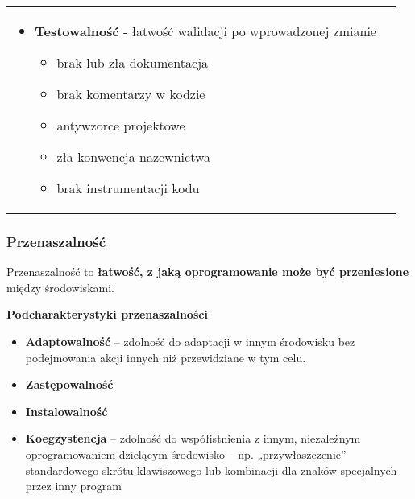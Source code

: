 \documentclass[../main.tex]{subfiles}
\begin{document}
\begin{table}[H]
\begin{center}
\begin{tabular}{p{8cm} | p{8cm}}
\begin{itemize}
                    \item \textbf{Testowalność} - łatwość walidacji po wprowadzonej zmianie
                    \begin{itemize}
                        \item brak lub zła dokumentacja
                        \item brak komentarzy w kodzie
                        \item antywzorce projektowe
                        \item zła konwencja nazewnictwa
                        \item brak instrumentacji kodu
                    \end{itemize}
                \end{itemize}\\
            \end{tabular}
        \end{center}
    \end{table}

    \subsubsection{Przenaszalność}
    Przenaszalność to \textbf{łatwość, z jaką oprogramowanie może być przeniesione} między środowiskami.

    \textbf{Podcharakterystyki przenaszalności}

    \begin{itemize}
        \item \textbf{Adaptowalność} – zdolność do adaptacji w innym środowisku bez
        podejmowania akcji innych niż przewidziane w tym celu.
        \item \textbf{Zastępowalność}
        \item \textbf{Instalowalność}
        \item \textbf{Koegzystencja} – zdolność do współistnienia z innym, niezależnym oprogramowaniem dzielącym środowisko
        – np. „przywłaszczenie” standardowego skrótu klawiszowego lub kombinacji dla znaków specjalnych przez inny program
    \end{itemize}
\end{document}

